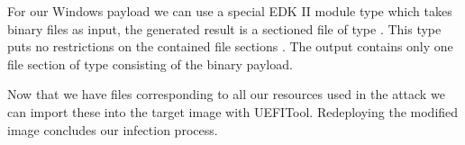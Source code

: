For our Windows payload we can use a special \ac{EDK} II module type which takes binary files as input, the generated result is a sectioned file of type .
This type puts no restrictions on the contained file sections \cite[Vol. 3, 2.1.4.1.7]{pi-spec}.
The output contains only one file section of type  consisting of the binary payload.

Now that we have  files corresponding to all our resources used in the attack we can import these into the target image with UEFITool.
Redeploying the modified image concludes our infection process.

\clearpage
